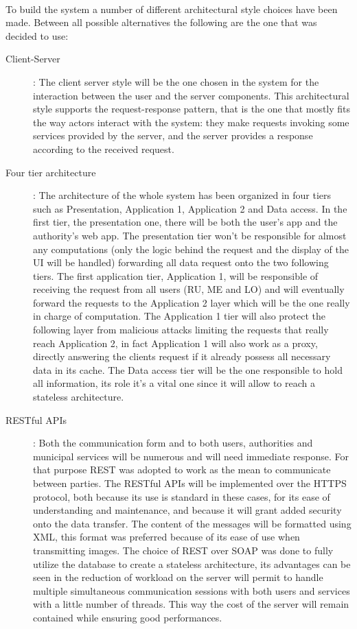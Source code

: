 			\paragraph{}
				To build the system a number of different architectural style choices have been made. Between all possible alternatives the following are the one that was decided to use:
					\begin{description}
						\item [Client-Server] : The client server style will be the one chosen in the system for the interaction between the user and the server components. This architectural style supports the request-response pattern, that is the one that mostly fits the way actors interact with the system: they make requests invoking some services provided by the server, and the server provides a response according to the received request.
						\item [Four tier architecture]: The architecture of the whole system has been organized in four tiers such as Presentation, Application 1, Application 2 and Data access. In the first tier, the presentation one, there will be both the user's app and the authority's web app. The presentation tier won't be responsible for almost any computations (only the logic behind the request and the display of the UI will be handled) forwarding all data request onto the two following tiers. The first application tier, Application 1, will be responsible of receiving the request from all users (RU, ME and LO) and will eventually forward the requests to the Application 2 layer which will be the one really in charge of computation. The Application 1 tier will also protect the following layer from malicious attacks limiting the requests that really reach Application 2, in fact Application 1 will also work as a proxy, directly answering the clients request if it already possess all necessary data in its cache. The Data access tier will be the one responsible to hold all information, its role it's a vital one since it will allow to reach a stateless architecture.  
						\item [RESTful APIs]: Both the communication form and to both users, authorities and municipal services will be numerous and will need immediate response. For that purpose REST was adopted to work as the mean to communicate between parties.  The RESTful APIs will be implemented over the HTTPS protocol, both because its use is standard in these cases, for its ease of understanding and maintenance, and because it will grant added security onto the data transfer. The content of the messages will be formatted using XML, this format was preferred because of its ease of use when transmitting images. The choice of REST over SOAP was done to fully utilize the database to create a stateless architecture, its advantages can be seen in the reduction of workload on the server will permit to handle multiple simultaneous communication sessions with both users and services with a little number of threads. This way the cost of the server will remain contained while ensuring good performances.
					\end{description}

